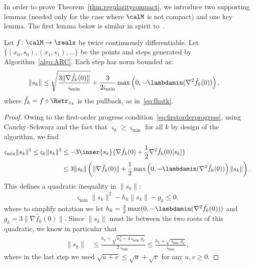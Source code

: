 In order to prove Theorem~\ref{thm:regularitycompact}, we introduce two supporting lemmas (needed only for the case where $\calM$ is not compact) and one key lemma. The first lemma below is similar in spirit to~\citep[Lem.~2.2]{cartis2011adaptivecubicPartI}.
\begin{lemma}\label{lem:boundessteps}
	Let $f \colon \calM \to \reals$ be twice continuously differentiable. %
	Let $\{ (x_0, s_0), (x_1, s_1), \ldots \}$ be the points and steps generated by Algorithm~\ref{algo:ARC}.
	Each step has norm bounded as:
	\begin{align}
		\|s_k\| & \leq \sqrt{\frac{3 \|\nabla \hat f_k(0)\|}{\varsigma_{\min}}} + \frac{3}{2\varsigma_{\min}} \max\left(0, -\lambdamin(\nabla^2 \hat f_k(0))\right),
	\end{align}
	where $\hat f_k = f \circ \Retr_{x_k}$ is the pullback, as in~\eqref{eq:fhatk}.
\end{lemma}
\begin{proof}
	Owing to the first-order progress condition~\eqref{eq:firstorderprogress}, using Cauchy--Schwarz and the fact that $\varsigma_k \geq \varsigma_{\min}$ for all $k$ by design of the algorithm, we find
	\begin{align*}
		\varsigma_{\min} \|s_k\|^3 \leq \varsigma_{k} \|s_k\|^3 & \leq -3\inner{s_k}{\nabla \hat f_k(0) + \frac{1}{2}\nabla^2 \hat f_k(0)[s_k]} \\
			& \leq 3 \|s_k\| \left( \|\nabla \hat f_k(0)\| + \frac{1}{2} \max\left(0, -\lambdamin(\nabla^2 \hat f_k(0))\right) \|s_k\| \right).
	\end{align*}
	This defines a quadratic inequality in $\|s_k\|$:
	\begin{align*}
		\varsigma_{\min} \|s_k\|^2 - h_k \|s_k\| - g_k \leq 0,
	\end{align*}
	where to simplify notation we let $h_k = \frac{3}{2} \max(0, -\lambdamin(\nabla^2 \hat f_k(0)))$ and $g_k = 3 \|\nabla \hat f_k(0)\|$. Since $\|s_k\|$ must lie between the two roots of this quadratic, we know in particular that
	\begin{align*}
		\|s_k\| & \leq \frac{h_k + \sqrt{h_k^2 + 4\varsigma_{\min}g_k}}{2\varsigma_{\min}} \leq \frac{h_k + \sqrt{\varsigma_{\min} g_k}}{\varsigma_{\min}},
	\end{align*}
	where in the last step we used $\sqrt{u+v} \leq \sqrt{u} + \sqrt{v}$ for any $u, v \geq 0$.
\end{proof}
